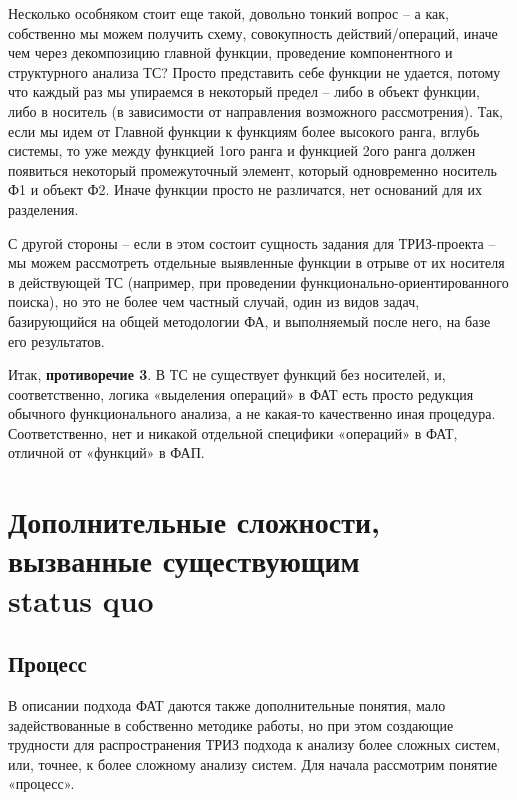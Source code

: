 \documentclass[11pt,a4paper]{article}
\begin{document}
Несколько особняком стоит еще такой, довольно тонкий вопрос -- а как,
собственно мы можем получить схему, совокупность действий/операций, иначе чем
через декомпозицию главной функции, проведение компонентного и структурного
анализа ТС? Просто представить себе функции не удается, потому что каждый раз
мы упираемся в некоторый предел – либо в объект функции, либо в носитель (в
зависимости от направления возможного рассмотрения). Так, если мы идем от
Главной функции к функциям более высокого ранга, вглубь системы, то уже между
функцией 1ого ранга и функцией 2ого ранга должен появиться некоторый
промежуточный элемент, который одновременно носитель Ф1 и объект Ф2. Иначе
функции просто не различатся, нет оснований для их разделения.

С другой стороны -- если в этом состоит сущность задания для ТРИЗ-проекта --
мы можем рассмотреть отдельные выявленные функции в отрыве от их носителя в
действующей ТС (например, при проведении функционально-ориентированного
поиска), но это не более чем частный случай, один из видов задач, базирующийся
на общей методологии ФА, и выполняемый после него, на базе его результатов.

Итак, \textbf{противоречие 3}. В ТС не существует функций без носителей, и,
соответственно, логика «выделения операций» в ФАТ есть просто редукция
обычного функционального анализа, а не какая-то качественно иная процедура.
Соответственно, нет и никакой отдельной специфики «операций» в ФАТ, отличной
от «функций» в ФАП.

\section{Дополнительные сложности, вызванные существующим\\ status quo}

\subsection{Процесс}

В описании подхода ФАТ даются также дополнительные понятия, мало задействованные
в собственно методике работы, но при этом создающие трудности для распространения
ТРИЗ подхода к анализу более сложных систем, или, точнее, к более сложному анализу
систем. Для начала рассмотрим понятие «процесс».
\end{document}
